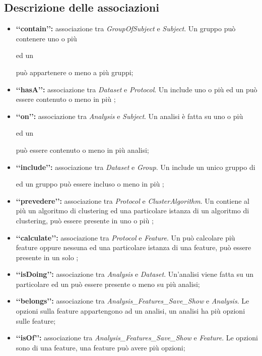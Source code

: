 \subsection{Descrizione delle associazioni}
\label{DBAss}
\begin{itemize}
\item \textbf{\lq\lq{}contain\rq\rq{}:} associazione tra \emph{GroupOfSubject} e \emph{Subject}. Un gruppo può contenere uno o più \subject{} ed un \subject{} può appartenere o meno a più gruppi;

\item \textbf{\lq\lq{}hasA\rq\rq{}:} associazione tra \emph{Dataset} e \emph{Protocol}. Un \dataset{} include uno o più \protocol{} ed un \protocol{} può essere contenuto o meno in più \dataset{};

\item \textbf{\lq\lq{}on\rq\rq{}:} associazione tra \emph{Analysis} e \emph{Subject}. Un analisi è fatta su uno o più \subject{} ed un \subject{} può essere contenuto o meno in più analisi;

\item \textbf{\lq\lq{}include\rq\rq{}:} associazione tra \emph{Dataset} e \emph{Group}. Un \dataset{} include un unico gruppo di \subject{} ed un gruppo può essere incluso o meno in più \dataset{};

\item \textbf{\lq\lq{}prevedere\rq\rq{}:} associazione tra \emph{Protocol} e \emph{ClusterAlgorithm}. Un \protocol{} contiene al più un algoritmo di clustering\glossario{} ed una particolare istanza di un algoritmo di clustering\glossario{}, può essere presente in uno o più \protocol{};

\item \textbf{\lq\lq{}calculate\rq\rq{}:} associazione tra \emph{Protocol} e \emph{Feature}. Un \protocol{} può calcolare più feature\g{} oppure nessuna ed una particolare istanza di una feature\glossario{}, può essere presente in un solo \protocol{};

\item \textbf{\lq\lq{}isDoing\rq\rq{}:} associazione tra \emph{Analysis} e \emph{Dataset}. Un'analisi viene fatta su un particolare \dataset{} ed un \dataset{} può essere presente o meno su più analisi;

\item \textbf{\lq\lq{}belongs\rq\rq{}:} associazione tra \emph{Analysis\_Features\_Save\_Show} e \emph{Analysis}. Le opzioni sulla feature\glossario{} appartengono ad un analisi, un analisi ha più opzioni sulle feature\glossario{};

\item \textbf{\lq\lq{}isOf\rq\rq{}:} associazione tra \emph{Analysis\_Features\_Save\_Show} e \emph{Feature}. Le opzioni sono di una feature\glossario{}, una feature\glossario{} può avere più opzioni;

\end{itemize}

